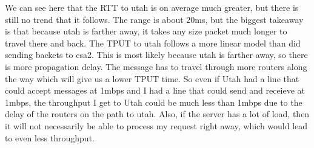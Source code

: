 \documentclass[11pt]{article}
\theoremstyle{definition}
\begin{document}
We can see here that the RTT to utah is on average much greater, but there is still no trend that it follows.  The range is about 20ms, but the biggest takeaway is that because utah is farther away, it takes any size packet much longer to travel there and back.  The TPUT to utah follows a more linear model than did sending backets to csa2.  This is most likely because utah is farther away, so there is more propagation delay.  The message has to travel through more routers along the way which will give us a lower TPUT time.  So even if Utah had a line that could accept messages at 1mbps and I had a line that could send and receieve at 1mbps, the throughput I get to Utah could be much less than 1mbps due to the delay of the routers on the path to utah.  Also, if the server has a lot of load, then it will not necessarily be able to process my request right away, which would lead to even less throughput.  
\end{document}
